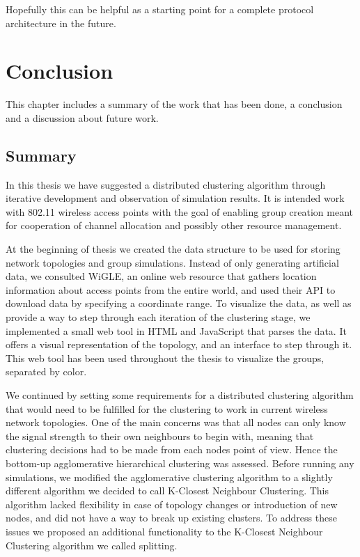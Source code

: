 Hopefully this can be helpful as a starting point for a complete protocol architecture in the future. 

\chapter{Conclusion}
This chapter includes a summary of the work that has been done, a conclusion and a discussion about future work. 
\section{Summary}
In this thesis we have suggested a distributed clustering algorithm through iterative development and observation of simulation results. It is intended work with 802.11 wireless access points
with the goal of enabling group creation meant for cooperation of channel allocation and possibly other resource management. 

At the beginning of thesis we created the data structure to be used for storing network topologies and group simulations. Instead of only generating artificial data,
we consulted WiGLE, an online web resource that gathers location information about access points from the entire world, and used their API to download data by specifying
a coordinate range. To visualize the data, as well as provide a way to step through each iteration of the clustering stage, we implemented a small web tool in HTML and JavaScript that parses the data.
It offers a visual representation of the topology, and an interface to step through it. This web tool has been used throughout the thesis to visualize the groups, separated by color. 

We continued by setting some requirements for a distributed clustering algorithm that would need to be fulfilled for the clustering to work in current wireless network topologies.
One of the main concerns was that all nodes can only know the signal strength to their own neighbours to begin with, meaning that clustering decisions had to be made from each nodes point of view.
Hence the bottom-up agglomerative hierarchical clustering was assessed. Before running any simulations, we modified the agglomerative clustering algorithm to a slightly different algorithm 
we decided to call K-Closest Neighbour Clustering. This algorithm lacked flexibility in case of topology changes or introduction of new nodes, and did not have a way to break up existing clusters.
To address these issues we proposed an additional functionality to the K-Closest Neighbour Clustering algorithm we called splitting.

